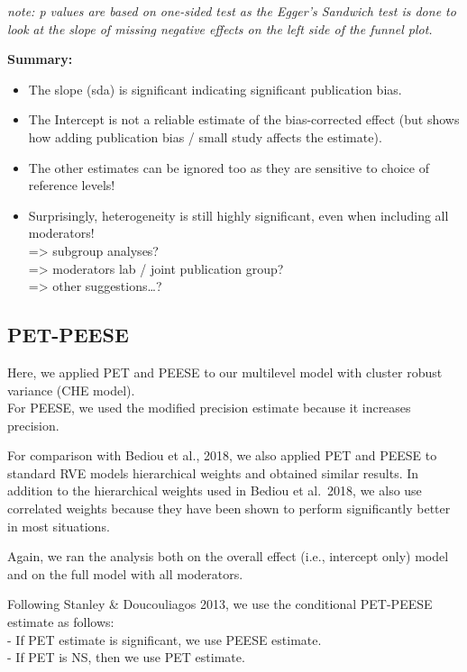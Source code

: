 \documentclass[
]{book}
\providecommand{\tightlist}{%
  \setlength{\itemsep}{0pt}\setlength{\parskip}{0pt}}
\begin{document}
\emph{note: p values are based on one-sided test as the Egger's Sandwich test is done to look}
\emph{at the slope of missing negative effects on the left side of the funnel plot.}

\textbf{Summary:}

\begin{itemize}
\tightlist
\item
  The slope (sda) is significant indicating significant publication bias.\\
\item
  The Intercept is not a reliable estimate of the bias-corrected effect (but shows how adding
  publication bias / small study affects the estimate).\\
\item
  The other estimates can be ignored too as they are sensitive to choice of reference levels!\\
\item
  Surprisingly, heterogeneity is still highly significant, even when including all moderators!\\
  =\textgreater{} subgroup analyses?\\
  =\textgreater{} moderators lab / joint publication group?\\
  =\textgreater{} other suggestions\ldots?
\end{itemize}

\hypertarget{pet-peese}{%
\subsection{PET-PEESE}\label{pet-peese}}

Here, we applied PET and PEESE to our multilevel model with cluster robust variance (CHE model).\\
For PEESE, we used the modified precision estimate because it increases precision.

For comparison with Bediou et al., 2018, we also applied PET and PEESE to standard RVE models
hierarchical weights and obtained similar results. In addition to the hierarchical weights
used in Bediou et al.~2018, we also use correlated weights because they have been shown to
perform significantly better in most situations.

Again, we ran the analysis both on the overall effect (i.e., intercept only) model and on the full model
with all moderators.

Following Stanley \& Doucouliagos 2013, we use the conditional PET-PEESE estimate as follows:\\
- If PET estimate is significant, we use PEESE estimate.\\
- If PET is NS, then we use PET estimate.
\end{document}
